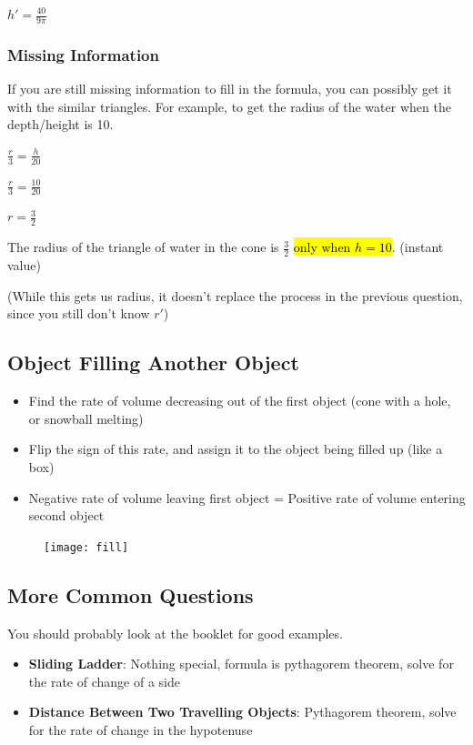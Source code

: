 \documentclass[a4paper,12pt]{article}
\begin{document}
$h' = \frac{40}{9\pi}$

\subsubsection{Missing Information}
If you are still missing information to fill in the formula, you can possibly get it with the similar triangles. For example, to get the radius of the water when the depth/height is 10.

$\frac{r}{3} = \frac{h}{20}$

$\frac{r}{3} = \frac{10}{20}$

$r = \frac{3}{2}$

The radius of the triangle of water in the cone is $\frac{3}{2}$ \hl{only when $h = 10$}. (instant value)

(While this gets us radius, it doesn't replace the process in the previous question, since you still don't know $r'$)

\pagebreak

\subsection{Object Filling Another Object}
\begin{itemize}
    \item{Find the rate of volume decreasing out of the first object (cone with a hole, or snowball melting)}
    \item{Flip the sign of this rate, and assign it to the object being filled up (like a box)}
    \item{Negative rate of volume leaving first object = Positive rate of volume entering second object}
\end{itemize}

\begin{figure}[H]
    \centering
    \texttt{[image: fill]}
\end{figure}

\pagebreak

\subsection{More Common Questions}
You should probably look at the booklet for good examples.
\begin{itemize}
    \item{\textbf{Sliding Ladder}: Nothing special, formula is pythagorem theorem, solve for the rate of change of a side}
    \item{\textbf{Distance Between Two Travelling Objects}: Pythagorem theorem, solve for the rate of change in the hypotenuse}
\end{itemize}
\end{document}

